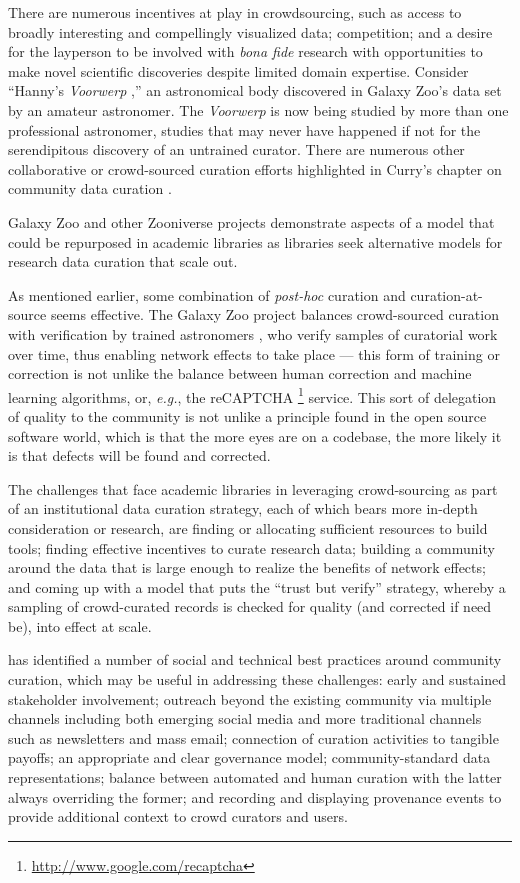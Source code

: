 \documentclass[12pt,letterpaper,titlepage,onecolumn,biblatex,backend=biber,style=chicago-authordate]{article}
\begin{document}
There are numerous incentives at play in crowdsourcing, such as access
to broadly interesting and compellingly visualized data; competition;
and a desire for the layperson to be involved with \textit{bona fide}
research with opportunities to make novel scientific discoveries
despite limited domain expertise. Consider ``Hanny's
\textit{Voorwerp} \autocite{wiki:voorwerp},'' an astronomical body
discovered in Galaxy Zoo's data set by an amateur astronomer. The
\textit{Voorwerp} is now being studied by more than one professional
astronomer, studies that may never have happened if not for the
serendipitous discovery of an untrained curator.  There are numerous
other collaborative or crowd-sourced curation efforts highlighted in
Curry's chapter on community data curation \autocite{curry:community}.

Galaxy Zoo and other Zooniverse projects demonstrate aspects of a
model that could be repurposed in academic libraries as libraries seek
alternative models for research data curation that scale out.

As mentioned earlier, some combination of \textit{post-hoc} curation
and curation-at-source seems effective. The Galaxy Zoo project
balances crowd-sourced curation with verification by trained
astronomers \autocite{adams:galaxyzoo}, who verify samples of curatorial
work over time, thus enabling network effects to take place --- this
form of training or correction is not unlike the balance between human
correction and machine learning algorithms, or, \textit{e.g.}, the
reCAPTCHA \footnote{\url{http://www.google.com/recaptcha}}
service. This sort of delegation of quality to the community is not
unlike a principle found in the open source software world, which is
that the more eyes are on a codebase, the more likely it is that
defects will be found and corrected.

The challenges that face academic libraries in leveraging
crowd-sourcing as part of an institutional data curation strategy,
each of which bears more in-depth consideration or research, are
finding or allocating sufficient resources to build tools; finding
effective incentives to curate research data; building a community
around the data that is large enough to realize the benefits of
network effects; and coming up with a model that puts the ``trust but
verify'' strategy, whereby a sampling of crowd-curated records is
checked for quality (and corrected if need be), into effect at scale.

\autocite{curry:community} has identified a number of social and
technical best practices around community curation, which may be
useful in addressing these challenges: early and sustained stakeholder
involvement; outreach beyond the existing community via multiple
channels including both emerging social media and more traditional
channels such as newsletters and mass email; connection of curation
activities to tangible payoffs; an appropriate and clear governance
model; community-standard data representations; balance between
automated and human curation with the latter always overriding the
former; and recording and displaying provenance events to provide
additional context to crowd curators and users.
\end{document}
